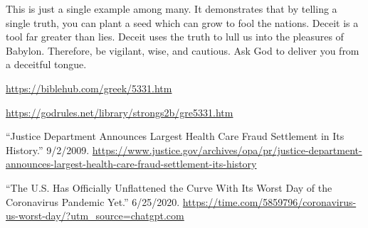 \documentclass[10pt]{article}
\begin{document}
\begin{multicols}{2}
This is just a single example among many. It demonstrates that by telling a single truth, you can plant a seed which can grow to fool the nations. Deceit is a tool far greater than lies. Deceit uses the truth to lull us into the pleasures of Babylon. Therefore, be vigilant, wise, and cautious. Ask God to deliver you from a deceitful tongue.

\end{multicols}

\begin{thebibliography}{9}
	{\footnotesize
		
		 \url{https://biblehub.com/greek/5331.htm}
		
		 \url{https://godrules.net/library/strongs2b/gre5331.htm}
		
		 ``Justice Department Announces Largest Health Care Fraud Settlement in Its History.'' 9/2/2009. \url{https://www.justice.gov/archives/opa/pr/justice-department-announces-largest-health-care-fraud-settlement-its-history}
		
		 ``The U.S. Has Officially Unflattened the Curve With Its Worst Day of the Coronavirus Pandemic Yet.'' 6/25/2020. \url{https://time.com/5859796/coronavirus-us-worst-day/?utm_source=chatgpt.com}
		
	}
\end{thebibliography}


\end{document}
